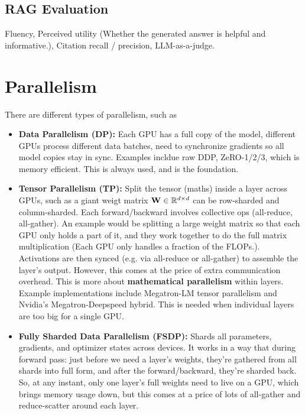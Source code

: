 \documentclass[11pt]{article}  %
\begin{document}
\subsection{RAG Evaluation}
Fluency, Perceived utility (Whether the generated answer is helpful and informative.), Citation recall / precision, LLM-as-a-judge.


\section{Parallelism}

There are different types of parallelism, such as 
\begin{itemize}
  \item \textbf{Data Parallelism (DP):} Each GPU has a full copy of the model, different GPUs process different data batches, need to synchronize gradients so all model copies stay in sync.
  Examples incldue raw DDP, ZeRO-1/2/3, which is memory efficient.
  This is always used, and is the foundation.

  \item \textbf{Tensor Parallelism (TP):} Split the tensor (maths) inside a layer across GPUs, such as a giant weigt matrix $\mathbf{W} \in \mathbb{R}^{d \times d}$ can be row-sharded and column-sharded. Each forward/backward involves collective ops (all-reduce, all-gather).
  An example would be splitting a large weight matrix so that each GPU only holds a part of it, and they work together to do the full matrix multiplication (Each GPU only handles a fraction of the FLOPs.).
  Activations are then synced (e.g. via all-reduce or all-gather) to assemble the layer's output.
  However, this comes at the price of extra communication overhead.
  This is more about \textbf{mathematical parallelism} within layers.
  Example implementations include Megatron-LM tensor parallelism and Nvidia's Megatron-Deepspeed hybrid.
  This is needed when individual layers are too big for a single GPU.

  \item \textbf{Fully Sharded Data Parallelism (FSDP):} Shards all parameters, gradients, and optimizer states across devices.
  It works in a way that during forward pass: just before we need a layer's weights, they're gathered from all shards into full form, and after the forward/backward, they're sharded back.
  So, at any instant, only one layer's full weights need to live on a GPU, which brings memory usage down, but this comes at a price of lots of all-gather and reduce-scatter around each layer.


\end{itemize}
\end{document}
